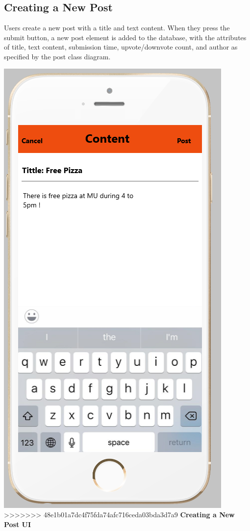 \documentclass[12pt]{article}
\begin{document}
\begin{center}
\subsection{Creating a New Post}
Users create a new post with a title and text content. When they press the submit button, a new post element is added to the database, with the attributes of title, text content, submission time, upvote/downvote count, and author as specified by the post class diagram.
\begin{center}
\includegraphics[scale=0.30]{img/ui/post}\linebreak
>>>>>>> 48e1b01a7dc4f75fda74afc716ceda03bda3d7a9
\textbf{Creating a New Post UI}
  \end{center}


\end{center}
\end{document}
